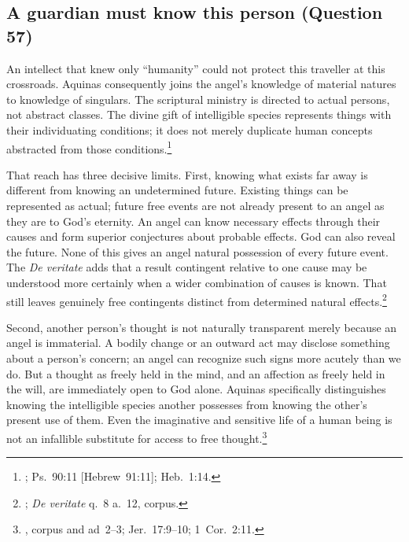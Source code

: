 
\subsection{A guardian must know this person (Question 57)}

An intellect that knew only ``humanity'' could not protect this traveller at this crossroads. Aquinas consequently joins the angel's knowledge of material natures to knowledge of singulars. The scriptural ministry is directed to actual persons, not abstract classes. The divine gift of intelligible species represents things with their individuating conditions; it does not merely duplicate human concepts abstracted from those conditions.\footnote{; Ps.~90:11 [Hebrew~91:11]; Heb.~1:14.}

That reach has three decisive limits. First, knowing what exists far away is different from knowing an undetermined future. Existing things can be represented as actual; future free events are not already present to an angel as they are to God's eternity. An angel can know necessary effects through their causes and form superior conjectures about probable effects. God can also reveal the future. None of this gives an angel natural possession of every future event. The \emph{De veritate} adds that a result contingent relative to one cause may be understood more certainly when a wider combination of causes is known. That still leaves genuinely free contingents distinct from determined natural effects.\footnote{; \emph{De veritate} q.~8 a.~12, corpus.}

Second, another person's thought is not naturally transparent merely because an angel is immaterial. A bodily change or an outward act may disclose something about a person's concern; an angel can recognize such signs more acutely than we do. But a thought as freely held in the mind, and an affection as freely held in the will, are immediately open to God alone. Aquinas specifically distinguishes knowing the intelligible species another possesses from knowing the other's present use of them. Even the imaginative and sensitive life of a human being is not an infallible substitute for access to free thought.\footnote{, corpus and ad~2--3; Jer.~17:9--10; 1~Cor.~2:11.}

